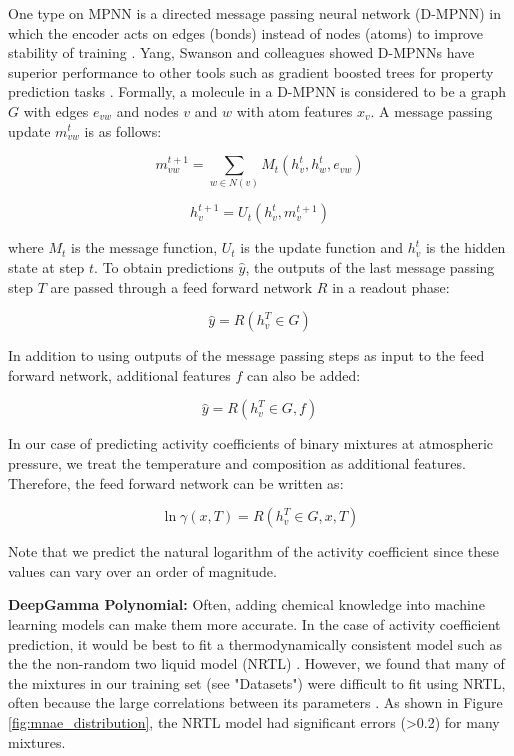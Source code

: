 One type on MPNN is a directed message passing neural network (D-MPNN) in which the encoder acts on edges (bonds) instead of nodes (atoms) to improve stability of training \cite{Yang2019}. Yang, Swanson and colleagues showed D-MPNNs have superior performance to other tools such as gradient boosted trees for property prediction tasks \cite{Yang2019}. Formally, a molecule in a D-MPNN is considered to be a graph $G$ with edges $e_{vw}$ and nodes $v$ and $w$ with atom features $x_v$. A message passing update $m_{vw}^{t}$ is as follows:

\begin{equation}
    m_{vw}^{t+1} = \sum_{w\in N(v)} M_t(h_v^t, h_w^t, e_{vw})
\end{equation}

\begin{equation}
    h_v^{t+1} = U_t(h_v^t, m_v^{t+1})
\end{equation}

where $M_t$ is the message function, $U_t$ is the update function and $h_v^{t}$ is the hidden state at step $t$. To obtain predictions $\hat y$, the outputs of the last message passing step $T$ are passed through a feed forward network $R$ in a readout phase:
 
\begin{equation}
    \hat y = R(h_v^T \in G)
\end{equation}

In addition to using outputs of the message passing steps as input to the feed forward network, additional features $f$ can also be added:

\begin{equation}
    \hat y = R(h_v^T \in G, f)
\end{equation}

In our case of predicting activity coefficients of binary mixtures at atmospheric pressure, we treat the temperature and composition as additional features. Therefore, the feed forward network can be written as:

\begin{equation}
   \ln \gamma(x,T)= R(h_v^T \in G, x, T)
\end{equation}

Note that we predict the natural logarithm of the activity coefficient since these values can vary over an order of magnitude.

\noindent
\textbf{DeepGamma Polynomial:} Often, adding chemical knowledge into machine learning models can make them more accurate. In the case of activity coefficient prediction, it would be best to fit a thermodynamically consistent model such as the the non-random two liquid model (NRTL) \cite{Renon1968}. However, we found that many of the mixtures in our training set (see "Datasets") were difficult to fit using NRTL, often because the large correlations between its parameters \cite{Holler2019}. As shown in Figure \ref{fig:mnae_distribution}, the NRTL model had significant errors (>0.2) for many mixtures.

